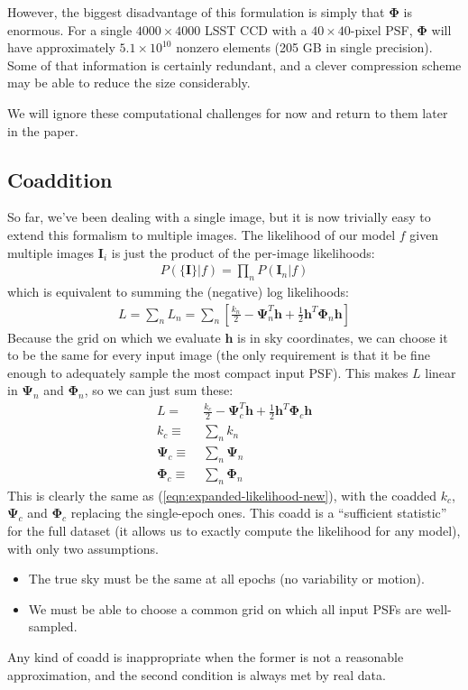 \documentclass[10pt]{article}
\newcommand{\eqnref}[1]{(\ref{eqn:#1})}
\begin{document}
However, the biggest disadvantage of this formulation is simply that $\bm{\Phi}$ is enormous.  For a single $4000 \times 4000$ LSST CCD with a $40\times 40$-pixel PSF, $\bm{\Phi}$ will have approximately $5.1\times 10^{10}$ nonzero elements (205 GB in single precision).  Some of that information is certainly redundant, and a clever compression scheme may be able to reduce the size considerably.

We will ignore these computational challenges for now and return to them later in the paper.

\subsection{Coaddition}

So far, we've been dealing with a single image, but it is now trivially easy to extend this formalism to multiple images.  The likelihood of our model $f$ given multiple images $\bm{I}_i$ is just the product of the per-image likelihoods:
\begin{align}
    P(\{\bm{I}\}|f) = \prod_n P(\bm{I}_n|f)
\end{align}
which is equivalent to summing the (negative) log likelihoods:
\begin{align}
    L = \sum_n L_n =
        \sum_n \left[ \frac{k_n}{2} - \bm{\Psi}_n^T\!\bm{h}
        + \frac{1}{2}\bm{h}^T\!\bm{\Phi}_n\bm{h} \right]
\end{align}
Because the grid on which we evaluate $\bm{h}$ is in sky coordinates, we can choose it to be the same for every input image (the only requirement is that it be fine enough to adequately sample the most compact input PSF).
This makes $L$ linear in $\bm{\Psi}_n$ and $\bm{\Phi}_n$, so we can just sum these:
\begin{align}
    L =\;& \frac{k_c}{2} - \bm{\Psi}_c^T\!\bm{h} + \frac{1}{2}\bm{h}^T\!\bm{\Phi}_c\bm{h} \\
    k_c \equiv\;& \sum_n k_n \\
    \bm{\Psi}_c \equiv\;& \sum_n \bm{\Psi}_n \\
    \bm{\Phi}_c \equiv\;& \sum_n \bm{\Phi}_n
\end{align}
This is clearly the same as \eqnref{expanded-likelihood-new}, with the coadded $k_c$, $\bm{\Psi}_c$ and $\bm{\Phi}_c$ replacing the single-epoch ones.  This coadd is a ``sufficient statistic'' for the full dataset (it allows us to exactly compute the likelihood for any model), with only two assumptions.
\begin{itemize}
\item The true sky must be the same at all epochs (no variability or motion).
\item We must be able to choose a common grid on which all input PSFs are well-sampled.
\end{itemize}
Any kind of coadd is inappropriate when the former is not a reasonable approximation, and the second condition is always met by real data.
\end{document}
